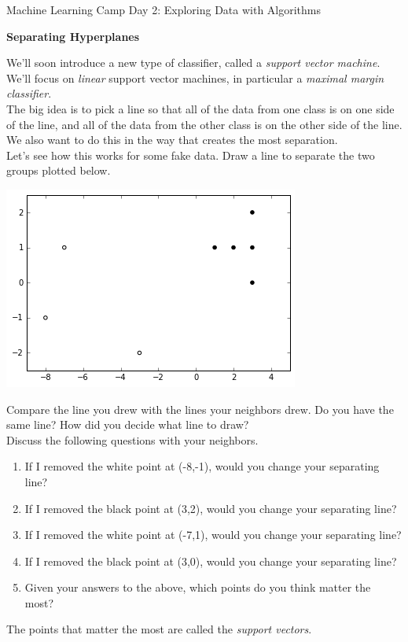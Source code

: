 \documentclass[10pt]{article}
\newcommand{\headerclass}{Machine Learning Camp}
\newcommand{\headersection}{Day 2: Exploring Data with Algorithms}
\newcommand{\headertitle}{Separating Hyperplanes}
\begin{document}
\headerclass\xspace {} \headersection\\
\begin{center}{ \large \textbf{\headertitle} }\end{center}

We'll soon introduce a new type of classifier, called a \emph{support vector machine}. We'll focus on \emph{linear} support vector machines, in particular a \emph{maximal margin classifier}.\\

The big idea is to pick a line so that all of the data from one class is on one side of the line, and all of the data from the other class is on the other side of the line. We also want to do this in the way that creates the most separation.\\

Let's see how this works for some fake data. Draw a line to separate the two groups plotted below.
\begin{center}
\includegraphics[scale = .75]{TwoClusters.png}
\end{center}
Compare the line you drew with the lines your neighbors drew. Do you have the same line? How did you decide what line to draw?\\

Discuss the following questions with your neighbors.

\begin{enumerate}
\item If I removed the white point at (-8,-1), would you change your separating line?
\vfill
\item If I removed the black point at (3,2), would you change your separating line?
\vfill
\item If I removed the white point at (-7,1), would you change your separating line?
\vfill
\item If I removed the black point at (3,0), would you change your separating line?
\vfill
\item Given your answers to the above, which points do you think matter the most?
\vfill
\end{enumerate}
The points that matter the most are called the \textit{support vectors}.
\end{document}
